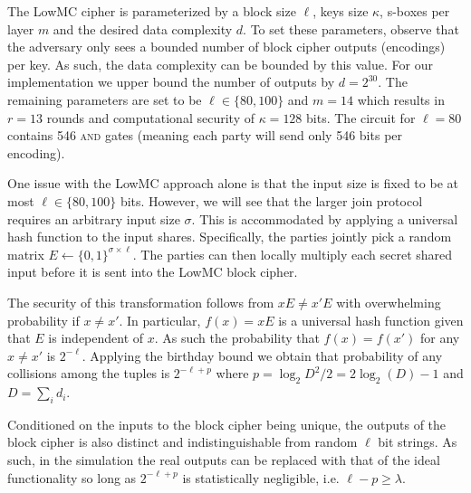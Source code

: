The LowMC cipher is parameterized by a block size $\ell$, keys size $\kappa$, s-boxes per layer $m$ and the desired data complexity $d$. To set these parameters, observe that the adversary only sees a bounded number of block cipher outputs (encodings) per key. As such, the data complexity can be bounded by this value. For our implementation we upper bound the number of outputs by $d= 2^{30}$. The remaining parameters are set to be $\ell\in\{80, 100\}$ and $m=14$ which results in $r=13$ rounds and computational security of $\kappa=128$ bits\cite{lowmc}. The circuit for $\ell=80$ contains 546 \textsc{and} gates (meaning each party will send only 546 bits per encoding).

%


One issue with the LowMC approach alone is that the input size is fixed to be at most $\ell\in\{80,100\}$ bits. However, we will see that the larger join protocol requires an arbitrary input size $\sigma$. This is accommodated by applying a universal hash function to the input shares. Specifically, the parties jointly pick a random matrix $E\gets\{0,1\}^{\sigma\times \ell}$. The parties can then locally multiply each secret shared input before it is sent into the LowMC block cipher.

The security of this transformation follows from $xE\neq x'E$ with overwhelming probability if $x\neq x'$. In particular, $f(x)=xE$ is a universal hash function given that $E$ is independent of $x$. As such the probability that $f(x)=f(x')$ for any $x\neq x'$  is $2^{-\ell}$. Applying the birthday bound we obtain that probability of any collisions among the tuples is $2^{-\ell+p}$ where $p=\log_2 D^2/2=2\log_2(D)-1$ and $D=\sum_i d_i$.

Conditioned on the inputs to the block cipher being unique, the outputs of the block cipher is also distinct and indistinguishable from random $\ell$ bit strings. As such, in the simulation the real outputs can be replaced with that of the ideal functionality so long as $2^{-\ell+p}$ is statistically negligible, i.e. $\ell-p\geq\lambda$.



